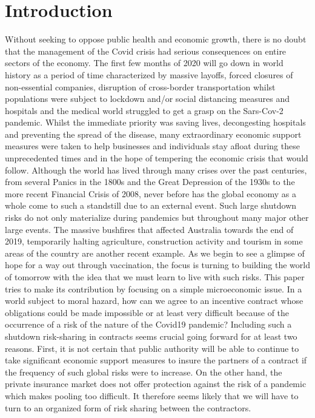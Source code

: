 \documentclass[numbook, envcountsect, envcountsame, envcountreset, runningheads, smallextended]{article}
\begin{document}
\section{Introduction}

Without seeking to oppose public health and economic growth, there is no doubt that the management of the Covid crisis had serious consequences on entire sectors of the economy. The first few months of 2020 will go down in world history as a period of time characterized by massive layoffs, forced closures of non-essential companies, disruption of cross-border transportation whilst populations were subject to lockdown and/or social distancing measures and  hospitals and the medical world struggled to get a grasp on the Sars-Cov-2 pandemic. Whilst the immediate priority was saving lives, decongesting hospitals and preventing the spread of the disease, many extraordinary economic support measures were taken to help businesses and individuals stay afloat during these unprecedented times and in the hope of tempering the economic crisis that would follow. Although the world has lived through many crises over the past centuries, from several Panics in the 1800s and the Great Depression of the 1930s to the more recent Financial Crisis of 2008, never before has the global economy as a whole come to such a standstill due to an external event.  Such large shutdown risks do not only materialize during pandemics but throughout many major other large events. The massive bushfires that affected Australia towards the end of 2019, temporarily halting agriculture, construction activity and tourism in some areas of the country are another recent example. 
As we begin to see a  glimpse of hope for a way out through vaccination, the focus is turning to building the world of tomorrow with the idea that we must learn to live with such risks.  This paper tries to make its contribution by focusing on a simple microeconomic issue. In a world subject to moral hazard, how can we agree to an incentive contract whose obligations could be made impossible or at least very difficult because of the occurrence of a risk of the nature of the Covid19 pandemic? Including such a shutdown risk-sharing in contracts seems crucial going forward for at least two reasons. First, it is not certain that public authority will be able to continue to take significant economic support measures to insure the partners of a contract if the frequency of such global risks were to increase. On the other hand, the private insurance market does not offer protection against the risk of a pandemic which makes pooling too difficult. It therefore seems likely that we will have to turn to an organized form of risk sharing between the contractors.\\
\end{document}
